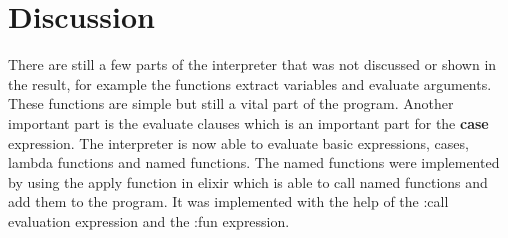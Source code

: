 \documentclass[a4paper,11pt]{article}
\begin{document}
\section*{Discussion}
There are still a few parts of the interpreter that was not discussed or shown in the result, for example the functions extract variables and evaluate arguments. These functions are simple but still a vital part of the program. Another important part is the evaluate clauses which is an important part for the \textbf{case} expression. The interpreter is now able to evaluate basic expressions, cases, lambda functions and named functions. The named functions were implemented by using the apply function in elixir which is able to call named functions and add them to the program. It was implemented with the help of the :call evaluation expression and the :fun expression.
\end{document}

